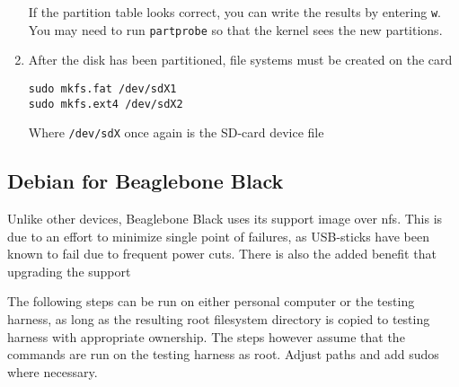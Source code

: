 \documentclass[a4paper,11pt]{article}
\newcommand{\cmd}[1]{\texttt{#1}}
\begin{document}
\begin{enumerate}
If the partition table looks correct, you can write the results by entering \cmd{w}. You may need to run \cmd{partprobe} so that the kernel sees the new partitions.

\item After the disk has been partitioned, file systems must be created on the card

\begin{lstlisting}
sudo mkfs.fat /dev/sdX1
sudo mkfs.ext4 /dev/sdX2
\end{lstlisting}

Where \cmd{/dev/sdX} once again is the SD-card device file
\end{enumerate}

\subsection{Debian for Beaglebone Black}

Unlike other devices, Beaglebone Black uses its support image over nfs. This is due to an effort to minimize single point of failures, as USB-sticks have been known to fail due to frequent power cuts. There is also the added benefit that upgrading the support 

The following steps can be run on either personal computer or the testing harness, as long as the resulting root filesystem directory is copied to testing harness with appropriate ownership. The steps however assume that the commands are run on the testing harness as root. Adjust paths and add sudos where necessary.
\end{document}
